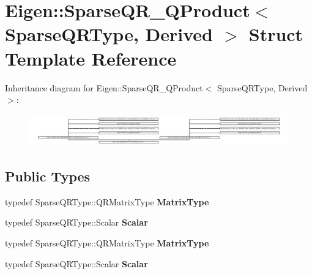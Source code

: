 \hypertarget{struct_eigen_1_1_sparse_q_r___q_product}{}\section{Eigen\+:\+:Sparse\+Q\+R\+\_\+\+Q\+Product$<$ Sparse\+Q\+R\+Type, Derived $>$ Struct Template Reference}
\label{struct_eigen_1_1_sparse_q_r___q_product}
Inheritance diagram for Eigen\+:\+:Sparse\+Q\+R\+\_\+\+Q\+Product$<$ Sparse\+Q\+R\+Type, Derived $>$\+:\begin{figure}[H]
\begin{center}
\leavevmode
\includegraphics[height=1.383855cm]{struct_eigen_1_1_sparse_q_r___q_product}
\end{center}
\end{figure}
\subsection*{Public Types}
\begin{DoxyCompactItemize}
\item 
\mbox{\label{struct_eigen_1_1_sparse_q_r___q_product_a849ced092fb297e3d6fa4907a341d6cb}} 
typedef Sparse\+Q\+R\+Type\+::\+Q\+R\+Matrix\+Type {\bfseries Matrix\+Type}
\item 
\mbox{\label{struct_eigen_1_1_sparse_q_r___q_product_ad87b00aa80804c14b5a8bbed340b7e08}} 
typedef Sparse\+Q\+R\+Type\+::\+Scalar {\bfseries Scalar}
\item 
\mbox{\label{struct_eigen_1_1_sparse_q_r___q_product_a849ced092fb297e3d6fa4907a341d6cb}} 
typedef Sparse\+Q\+R\+Type\+::\+Q\+R\+Matrix\+Type {\bfseries Matrix\+Type}
\item 
\mbox{\label{struct_eigen_1_1_sparse_q_r___q_product_ad87b00aa80804c14b5a8bbed340b7e08}} 
typedef Sparse\+Q\+R\+Type\+::\+Scalar {\bfseries Scalar}
\end{DoxyCompactItemize}
